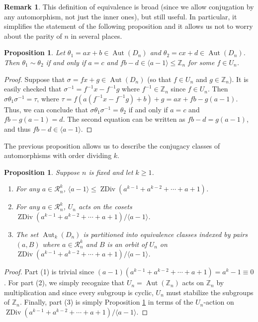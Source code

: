 \documentclass[12pt]{amsart}
\numberwithin{equation}{section}
\newtheorem{prop}[theorem]{Proposition}
\theoremstyle{definition}
\newtheorem{remark}[theorem]{Remark}
\newcommand{\Aut}{\operatorname{Aut}}
\newcommand{\Z}{\mathbb{Z}}
\newcommand{\zdiv}[1]{{\operatorname{ZDiv}(#1)}}
\renewcommand{\Z}{\mathbb{Z}}
\begin{document}
\begin{remark}
This definition of equivalence is broad (since we allow conjugation by
any automorphism, not just the inner ones), but still useful. In
particular, it simplifies the statement of the following proposition
and it allows us not to worry about the parity of $n$ in several places.
\end{remark}

\begin{prop}
\label{prop:equivalence}
Let $\theta_1=ax+b\in\Aut(D_n)$ and $\theta_2=cx+d\in\Aut(D_n)$. Then
$\theta_1\sim\theta_2$ if and only if $a=c$ and $fb-d\in\langle
a-1\rangle\leq \Z_n$ for some $f\in U_n$.
\end{prop}
\begin{proof}
  Suppose that $\sigma=fx+g\in\Aut(D_n)$ (so that $f\in U_n$ and $g\in\Z_n$). It is easily checked that $\sigma^{-1}=f^{-1}x-f^{-1}g$
  where $f^{-1}\in\Z_n$ since $f\in U_n$. Then
  $\sigma\theta_1\sigma^{-1}=\tau$, where
  $\tau=f(a(f^{-1}x-f^{-1}g)+b)+g=ax+fb-g(a-1)$. Thus, we can conclude
  that $\sigma\theta_1\sigma^{-1}=\theta_2$ if and only if $a=c$ and
  $fb-g(a-1)= d$. The second equation can be written as $fb-d=g(a-1)$, and thus $fb-d\in\langle
  a-1\rangle$.
\end{proof}

The previous proposition allows us to describe the conjugacy classes of automorphisms with order dividing $k$. 

\begin{prop}
\label{lem:equivalence}
Suppose $n$ is fixed and let $k\geq 1$.
\begin{enumerate}
\item
For any $a\in\mathcal{R}_n^k$, $\langle a-1\rangle\leq \zdiv{a^{k-1}+a^{k-2}+\cdots+a+1}$.
\item
For any $a\in\mathcal{R}_n^k$, $U_n$ acts on the cosets $\zdiv{a^{k-1}+a^{k-2}+\cdots+a+1}/\langle a-1\rangle$.
\item
The set $\Aut_k(D_n)$ is partitioned into equivalence classes indexed by pairs $(a,B)$ where $a\in\mathcal{R}_n^k$ and $B$ is an orbit of $U_n$ on \hbox{$\zdiv{a^{k-1}+a^{k-2}+\cdots +a+1}/\langle a-1\rangle$}.
\end{enumerate}
\end{prop}

\begin{proof}
Part (1) is trivial since $(a-1)(a^{k-1}+a^{k-2}+\cdots +a+1)=a^k-1\equiv 0$. For part (2), we simply recognize that $U_n=\Aut(\Z_n)$ acts on $\Z_n$ by multiplication and since every subgroup is cyclic, $U_n$ must stabilize the subgroups of $\Z_n$. Finally, part (3) is simply Proposition \ref{prop:equivalence} in terms of the $U_n$-action on $\zdiv{a^{k-1}+a^{k-2}+\cdots +a+1}/\langle a-1\rangle$.\end{proof}
\end{document}
